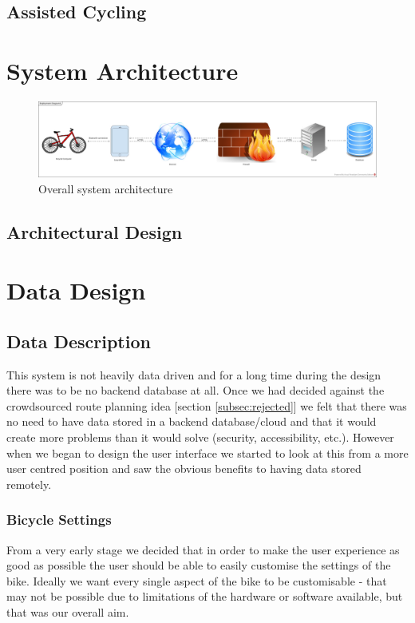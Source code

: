 \documentclass[a4paper]{report}
\begin{document}
\section{Assisted Cycling}

\chapter{System Architecture}

\begin{figure}[h]
\centering
\includegraphics[scale=0.2]{figures/system_architecture/overall_sys_arch}
\caption{Overall system architecture}
\label{fig:overall_sys_arch}
\end{figure}

\section{Architectural Design}

\chapter{Data Design}
\section{Data Description}
This system is not heavily data driven and for a long time during the design there was to be no backend database at all. Once we had decided against the crowdsourced route planning idea [section \ref{subsec:rejected}] we felt that there was no need to have data stored in a backend database/cloud and that it would create more problems than it would solve (security, accessibility, etc.). However when we began to design the user interface we started to look at this from a more user centred position and saw the obvious benefits to having data stored remotely.
\subsection{Bicycle Settings}
From a very early stage we decided that in order to make the user experience as good as possible the user should be able to easily customise the settings of the bike. Ideally we want every single aspect of the bike to be customisable - that may not be possible due to limitations of the hardware or software available, but that was our overall aim. 
\end{document}
